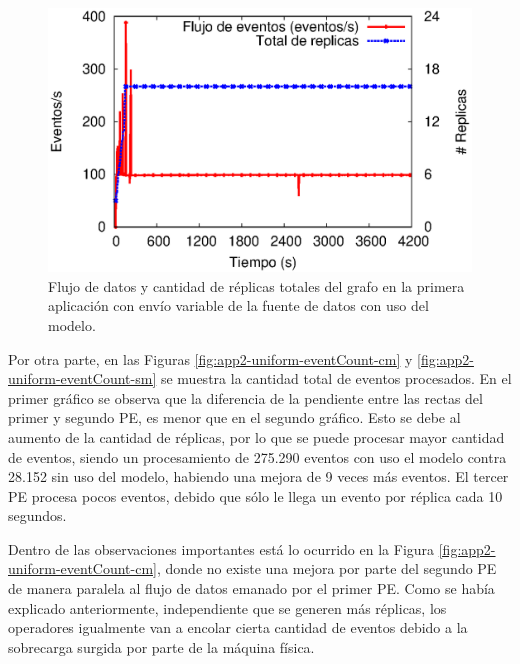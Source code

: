 \begin{figure}[!ht]
	\centering
	\includegraphics[scale=0.7]{images/exp/app2/uniform/cm/processSystem.eps}
    \caption{Flujo de datos y cantidad de réplicas totales del grafo en la primera aplicación con envío variable de la fuente de datos con uso del modelo.}
	\label{fig:app2-uniform-processSystem-cm}
\end{figure}



Por otra parte, en las Figuras \ref{fig:app2-uniform-eventCount-cm} y \ref{fig:app2-uniform-eventCount-sm} se muestra la cantidad total de eventos procesados. En el primer gráfico se observa que la diferencia de la pendiente entre las rectas del primer y segundo PE, es menor que en el segundo gráfico. Esto se debe al aumento de la cantidad de réplicas, por lo que se puede procesar mayor cantidad de eventos, siendo un procesamiento de 275.290 eventos con uso el modelo contra 28.152 sin uso del modelo, habiendo una mejora de 9 veces más eventos. El tercer PE procesa pocos eventos, debido que sólo le llega un evento por réplica cada 10 segundos.

Dentro de las observaciones importantes está lo ocurrido en la Figura \ref{fig:app2-uniform-eventCount-cm}, donde no existe una mejora por parte del segundo PE de manera paralela al flujo de datos emanado por el primer PE. Como se había explicado anteriormente, independiente que se generen más réplicas, los operadores igualmente van a encolar cierta cantidad de eventos debido a la sobrecarga surgida por parte de la máquina física.

